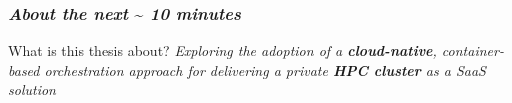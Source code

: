 \begin{frame}
  \frametitle{ \textit{About the next }\sim \textit{ 10 minutes}}
  \begin{block}{ What is this thesis about?}
    \textit{
%
      Exploring the adoption of a \alert{\textbf{cloud-native}}, container-based orchestration
      approach for delivering a private \alert{\textbf{HPC cluster}} as a SaaS solution
    }
  \end{block}
\end{frame}

